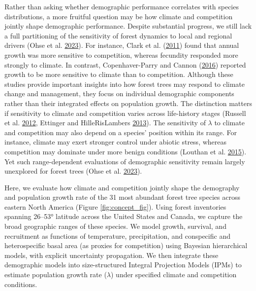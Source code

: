 \documentclass[12pt]{article}
\begin{document}
Rather than asking whether demographic performance correlates with
species distributions, a more fruitful question may be how climate and
competition jointly shape demographic performance. Despite substantial
progress, we still lack a full partitioning of the sensitivity of forest
dynamics to local and regional drivers (Ohse et al.
\protect\hyperlink{ref-Ohse2023}{2023}). For instance, Clark et al.
(\protect\hyperlink{ref-Clark2011}{2011}) found that annual growth was
more sensitive to competition, whereas fecundity responded more strongly
to climate. In contrast, Copenhaver-Parry and Cannon
(\protect\hyperlink{ref-CopenhaverParry2016}{2016}) reported growth to
be more sensitive to climate than to competition. Although these studies
provide important insights into how forest trees may respond to climate
change and management, they focus on individual demographic components
rather than their integrated effects on population growth. The
distinction matters if sensitivity to climate and competition varies
across life-history stages (Russell et al.
\protect\hyperlink{ref-Russell2012}{2012}, Ettinger and HilleRisLambers
\protect\hyperlink{ref-Ettinger2013}{2013}). The sensitivity of
\(\lambda\) to climate and competition may also depend on a species'
position within its range. For instance, climate may exert stronger
control under abiotic stress, whereas competition may dominate under
more benign conditions (Louthan et al.
\protect\hyperlink{ref-Louthan2015}{2015}). Yet such range-dependent
evaluations of demographic sensitivity remain largely unexplored for
forest trees (Ohse et al. \protect\hyperlink{ref-Ohse2023}{2023}).

Here, we evaluate how climate and competition jointly shape the
demography and population growth rate of the 31 most abundant forest
tree species across eastern North America (Figure
\ref{fig:concept_fig}). Using forest inventories spanning 26--53°
latitude across the United States and Canada, we capture the broad
geographic ranges of these species. We model growth, survival, and
recruitment as functions of temperature, precipitation, and conspecific
and heterospecific basal area (as proxies for competition) using
Bayesian hierarchical models, with explicit uncertainty propagation. We
then integrate these demographic models into size-structured Integral
Projection Models (IPMs) to estimate population growth rate
(\(\lambda\)) under specified climate and competition conditions.
\end{document}
